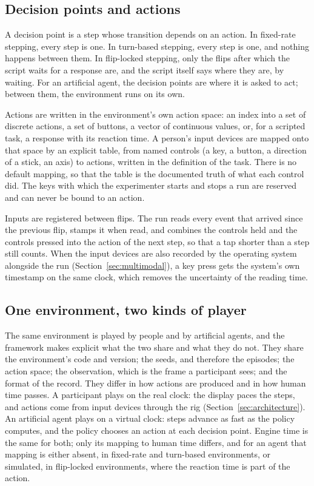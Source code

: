 \subsection{Decision points and actions}
\label{sec:actions}

A decision point is a step whose transition depends on an action.
In fixed-rate stepping, every step is one.
In turn-based stepping, every step is one, and nothing happens between them.
In flip-locked stepping, only the flips after which the script waits for a response are, and the script itself says where they are, by waiting.
For an artificial agent, the decision points are where it is asked to act; between them, the environment runs on its own.

Actions are written in the environment's own action space: an index into a set of discrete actions, a set of buttons, a vector of continuous values, or, for a scripted task, a response with its reaction time.
A person's input devices are mapped onto that space by an explicit table, from named controls (a key, a button, a direction of a stick, an axis) to actions, written in the definition of the task.
There is no default mapping, so that the table is the documented truth of what each control did.
The keys with which the experimenter starts and stops a run are reserved and can never be bound to an action.

Inputs are registered between flips.
The run reads every event that arrived since the previous flip, stamps it when read, and combines the controls held and the controls pressed into the action of the next step, so that a tap shorter than a step still counts.
When the input devices are also recorded by the operating system alongside the run (Section~\ref{sec:multimodal}), a key press gets the system's own timestamp on the same clock, which removes the uncertainty of the reading time.

\subsection{One environment, two kinds of player}
\label{sec:players}

The same environment is played by people and by artificial agents, and the framework makes explicit what the two share and what they do not.
They share the environment's code and version; the seeds, and therefore the episodes; the action space; the observation, which is the frame a participant sees; and the format of the record.
They differ in how actions are produced and in how human time passes.
A participant plays on the real clock: the display paces the steps, and actions come from input devices through the rig (Section~\ref{sec:architecture}).
An artificial agent plays on a virtual clock: steps advance as fast as the policy computes, and the policy chooses an action at each decision point.
Engine time is the same for both; only its mapping to human time differs, and for an agent that mapping is either absent, in fixed-rate and turn-based environments, or simulated, in flip-locked environments, where the reaction time is part of the action.

